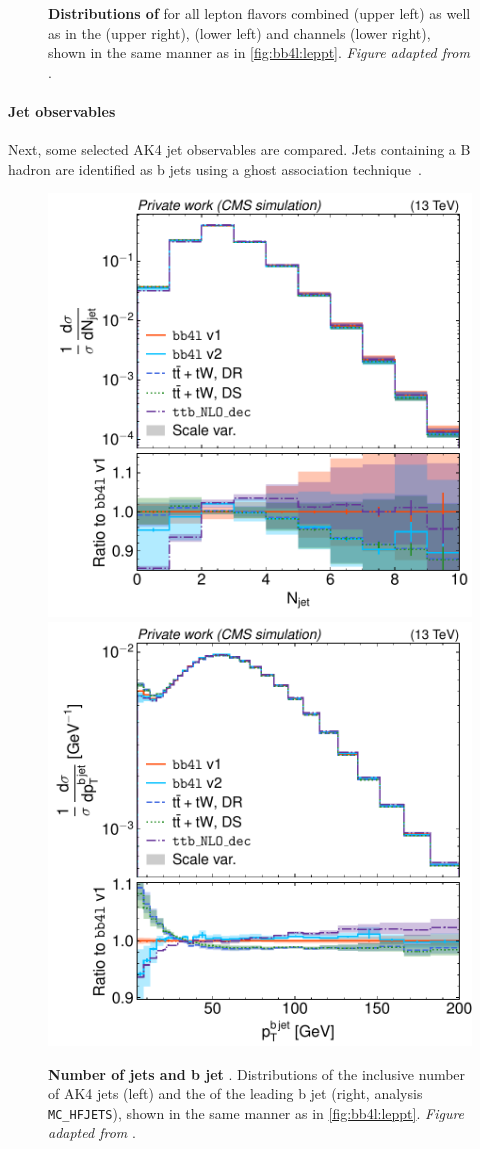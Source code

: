 \begin{figure}[tp]
    \caption{\textbf{Distributions of \mll} for all lepton flavors combined (upper left) as well as in the \emu (upper right), \ee (lower left) and \mumu channels (lower right), shown in the same manner as in \cref{fig:bb4l:leppt}. \textit{Figure adapted from }.}
    \label{fig:bb4l:mll}
\end{figure}

\paragraph{Jet observables} Next, some selected AK4 jet observables are compared. 
Jets containing a B hadron are identified as b jets using a ghost association technique~\cite{Cacciari:2007fd,Cacciari:2008gn}. 

\begin{figure}[tp]
    \centering
    \includegraphics[width=0.49 \textwidth]{figures/bb4l/generators/MC_TTBAR_DILEP_SPINDENSITY_njet.pdf}
    \hfill
    \includegraphics[width=0.49 \textwidth]{figures/bb4l/generators/MC_HFJETS_ptBJetLead.pdf}
    \caption{\textbf{Number of jets and b jet \pt}. Distributions of the inclusive number of AK4 jets (left) and the \pt of the leading b jet (right, \rivet analysis \texttt{MC\_HFJETS}), shown in the same manner as in \cref{fig:bb4l:leppt}. \textit{Figure adapted from }.}
    \label{fig:bb4l:jets1}
\end{figure}


